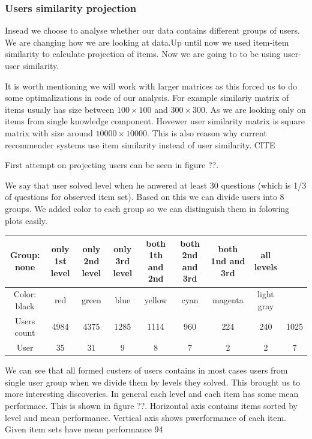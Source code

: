 \documentclass[
  digital, %
  table,   %
  nolof,     %
  nolot,     %
  nocover
]{fithesis3}
\begin{document}
\subsubsection{Users similarity
projection}\label{users-similarity-projection}

Insead we choose to analyse whether our data contains different groups
of users. We are changing how we are looking at data.Up until now we
used item-item similarity to calculate projection of items. Now we are
going to to be using user-user similarity.

It is worth mentioning we will work with larger matrices as this forced
us to do some optimalizations in code of our analysis. For example
similariy matrix of items usualy has size between $100\times 100$ and
$300\times 300$. As we are looking only on items from single knowledge
component. Hovewer user similarity matrix is square matrix with size
around $10 000\times 10 000$. This is also reason why current
recommender systems use item similarity instead of user similarity. CITE

First attempt on projecting users can be seen in figure ??.


We say that user solved level when he anwered at least 30 questions
(which is 1/3 of questions for observed item set). Based on this we can
divide users into 8 groups. We added color to each group so we can
distinguish them in folowing plots easily.

\begin{center}
  \begin{tabular}{|c|c c c c c c c c|}
    \hline
    Group: none & only 1st level & only 2nd level & only 3rd level & both 1th and 2nd & both 2nd and 3rd & both 1nd and 3rd & all levels \\
    \hline
    Color: black & red & green & blue & yellow & cyan & magenta & light gray \\
    \hline
    Users count & 4984 & 4375 & 1285 & 1114 & 960 & 224 & 240 & 1025 \\
    \hline
    User & 35 & 31 & 9 & 8 & 7 & 2 & 2 & 7 \\
    \hline
  \end{tabular}
\end{center}

We can see that all formed custers of users contains in most cases users
from single user group when we divide them by levels they solved. This
brought us to more interesting discoveries. In general each level and
each item has some mean performace. This is shown in figure ??.
Horizontal axis contains items sorted by level and mean performance.
Vertical axis shows pwerformance of each item. Given item sets have mean
performance 94%
\end{document}

